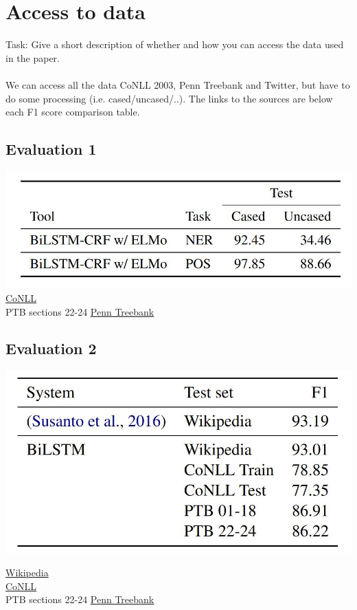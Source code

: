 \documentclass{article}
\begin{document}
\section{Access to data}
Task: Give a short description of whether and how you can access the data used in the paper.
\\
\\
We can access all the data CoNLL 2003, Penn Treebank and Twitter, but have to do some processing (i.e. cased/uncased/..). The links to the sources are below each F1 score comparison table.


\subsection*{Evaluation 1}
\includegraphics{stat1}
\\
\href{https://dl.acm.org/doi/10.3115/1119176.1119195}{CoNLL}
\\
PTB sections 22-24 \href{https://www.seas.upenn.edu/~pdtb/}{Penn Treebank}


\subsection*{Evaluation 2}
\includegraphics{stat2}

\noindent
\href{https://www.aclweb.org/anthology/W11-1601.pdf}{Wikipedia}\\
\href{https://dl.acm.org/doi/10.3115/1119176.1119195}{CoNLL}\\
PTB sections 22-24 \href{https://www.seas.upenn.edu/~pdtb/}{Penn Treebank}
\end{document}
